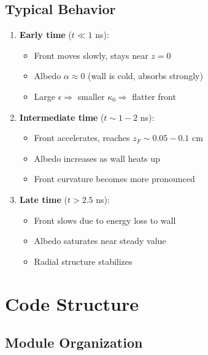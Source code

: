 \documentclass[12pt,a4paper]{article}
\begin{document}
\subsection{Typical Behavior}

\begin{enumerate}
    \item \textbf{Early time} ($t \ll 1$ ns):
    \begin{itemize}
        \item Front moves slowly, stays near $z=0$
        \item Albedo $\alpha \approx 0$ (wall is cold, absorbs strongly)
        \item Large $\epsilon \Rightarrow$ smaller $\kappa_0 \Rightarrow$ flatter front
    \end{itemize}
    
    \item \textbf{Intermediate time} ($t \sim 1-2$ ns):
    \begin{itemize}
        \item Front accelerates, reaches $z_F \sim 0.05-0.1$ cm
        \item Albedo increases as wall heats up
        \item Front curvature becomes more pronounced
    \end{itemize}
    
    \item \textbf{Late time} ($t > 2.5$ ns):
    \begin{itemize}
        \item Front slows due to energy loss to wall
        \item Albedo saturates near steady value
        \item Radial structure stabilizes
    \end{itemize}
\end{enumerate}

\section{Code Structure}

\subsection{Module Organization}
\end{document}
